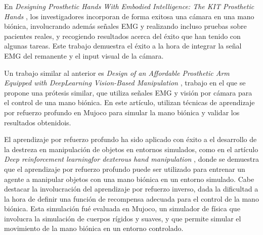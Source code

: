 En \textit{Designing Prosthetic Hands With Embodied Intelligence: The KIT Prosthetic Hands} \citep{kit2021prosthetic} , los investigadores incorporan de forma exitosa una cámara en una mano biónica, involucrando además señales EMG y realizando incluso pruebas sobre pacientes reales, y recogiendo resultados acerca del éxito que han tenido con algunas tareas. Este trabajo demuestra el éxito a la hora de integrar la señal EMG del remanente y el input visual de la cámara.

Un trabajo similar al anterior es \textit{Design of an Affordable Prosthetic Arm Equipped with DeepLearning Vision-Based Manipulation} \citep{prosthesisdeeplearning}, trabajo en el que se propone una prótesis similar, que utiliza señales EMG y visión por cámara para el control de una mano biónica. En este artículo, utilizan técnicas de aprendizaje por refuerzo profundo en Mujoco para simular la mano biónica y validar los resultados obtenidois.

El aprendizaje por refuerzo profundo ha sido aplicado con éxito a el desarrollo de la destreza en manipulación de objetos en entornos simulados, como en el artículo \textit{Deep reinforcement learningfor dexterous hand manipulation} \citep{deepdexterous}, donde se demuestra que el aprendizaje por refuerzo profundo puede ser utilizado para entrenar un agente a manipular objetos con una mano biónica en un entorno simulado. Cabe destacar la involucración del aprendizaje por refuerzo inverso, dada la dificultad a la hora de definir una función de recompensa adecuada para el control de la mano biónica. Esta simulación fué evaluada en Mujoco, un simulador de física que involucra la simulación de cuerpos rígidos y suaves, y que permite simular el movimiento de la mano biónica en un entorno controlado.


\medskip


